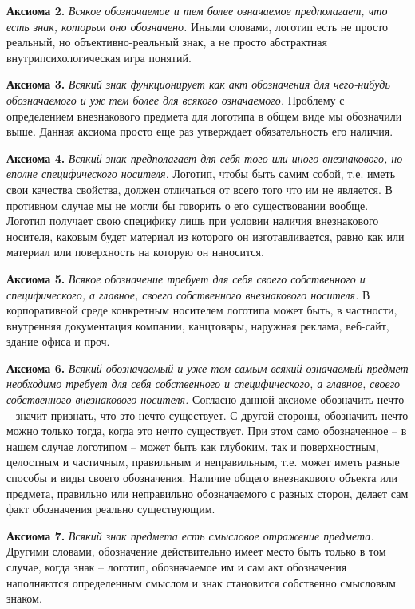 \textbf{Аксиома 2.} \emph{Всякое обозначаемое и тем более означаемое предполагает,
    что есть знак, которым оно обозначено.} Иными словами, логотип есть не просто
  реальный, но объективно-реальный знак, а не просто абстрактная
  внутрипсихологическая игра понятий.

\textbf{Аксиома 3.} \emph{Всякий знак функционирует как акт обозначения для
    чего-нибудь обозначаемого и уж тем более для всякого означаемого.}
  Проблему с определением внезнакового предмета для логотипа в общем виде
  мы обозначили выше. Данная аксиома просто еще раз утверждает обязательность
  его наличия.

\textbf{Аксиома 4.} \emph{Всякий знак предполагает для себя того или иного
    внезнакового, но вполне специфического носителя.} Логотип, чтобы быть
  самим собой, т.е. иметь свои качества свойства, должен отличаться
  от всего того что им не является. В противном случае мы не могли бы
  говорить о его существовании вообще. Логотип получает свою специфику
  лишь при условии наличия внезнакового носителя, каковым будет
  материал из которого он изготавливается, равно как или материал или
  поверхность на которую он наносится.

\textbf{Аксиома 5.} \emph{Всякое обозначение требует для себя своего
    собственного и специфического, а главное, своего собственного внезнакового
    носителя.} В корпоративной среде конкретным носителем логотипа может быть,
  в частности, внутренняя документация компании, канцтовары,
  наружная реклама, веб-сайт, здание офиса и проч.

\textbf{Аксиома 6.} \emph{Всякий обозначаемый и уже тем самым всякий означаемый
    предмет необходимо требует для себя собственного и специфического, а
    главное, своего собственного внезнакового носителя.}
  Согласно данной аксиоме обозначить нечто -- значит признать, что это
  нечто существует. С другой стороны, обозначить нечто можно только тогда,
  когда это нечто существует. При этом само обозначенное -- в нашем случае
  логотипом -- может быть как глубоким, так и поверхностным, целостным и
  частичным, правильным и неправильным, т.е. может иметь разные способы и
  виды своего обозначения. Наличие общего внезнакового объекта или предмета,
  правильно или неправильно обозначаемого с разных сторон, делает сам
  факт обозначения реально существующим.

\textbf{Аксиома 7.} \emph{Всякий знак предмета есть смысловое отражение
    предмета.} Другими словами, обозначение действительно имеет место
  быть только в том случае, когда знак -- логотип, обозначаемое им и
  сам акт обозначения наполняются определенным смыслом и знак становится
  собственно смысловым знаком.

